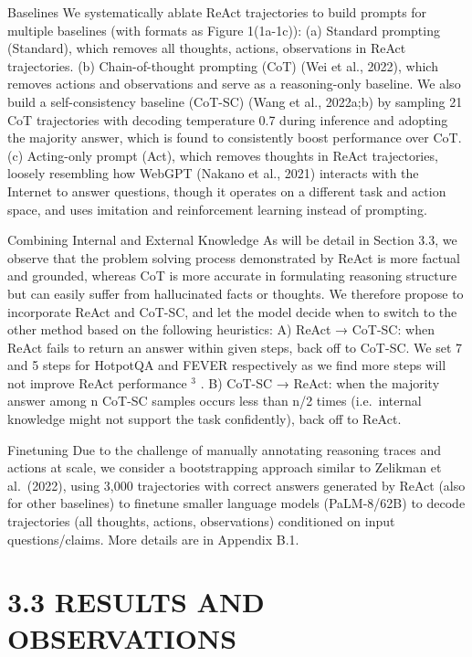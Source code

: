 \documentclass[
]{article}
\begin{document}
Baselines We systematically ablate ReAct trajectories to build prompts
for multiple baselines (with formats as Figure 1(1a-1c)): (a) Standard
prompting (Standard), which removes all thoughts, actions, observations
in ReAct trajectories. (b) Chain-of-thought prompting (CoT) (Wei et al.,
2022), which removes actions and observations and serve as a
reasoning-only baseline. We also build a self-consistency baseline
(CoT-SC) (Wang et al., 2022a;b) by sampling 21 CoT trajectories with
decoding temperature 0.7 during inference and adopting the majority
answer, which is found to consistently boost performance over CoT. (c)
Acting-only prompt (Act), which removes thoughts in ReAct trajectories,
loosely resembling how WebGPT (Nakano et al., 2021) interacts with the
Internet to answer questions, though it operates on a different task and
action space, and uses imitation and reinforcement learning instead of
prompting.

Combining Internal and External Knowledge As will be detail in Section
3.3, we observe that the problem solving process demonstrated by ReAct
is more factual and grounded, whereas CoT is more accurate in
formulating reasoning structure but can easily suffer from hallucinated
facts or thoughts. We therefore propose to incorporate ReAct and CoT-SC,
and let the model decide when to switch to the other method based on the
following heuristics: A) ReAct → CoT-SC: when ReAct fails to return an
answer within given steps, back off to CoT-SC. We set 7 and 5 steps for
HotpotQA and FEVER respectively as we find more steps will not improve
ReAct performance \(^{3}\) . B) CoT-SC → ReAct: when the majority answer
among n CoT-SC samples occurs less than n/2 times (i.e.~internal
knowledge might not support the task confidently), back off to ReAct.

Finetuning Due to the challenge of manually annotating reasoning traces
and actions at scale, we consider a bootstrapping approach similar to
Zelikman et al.~(2022), using 3,000 trajectories with correct answers
generated by ReAct (also for other baselines) to finetune smaller
language models (PaLM-8/62B) to decode trajectories (all thoughts,
actions, observations) conditioned on input questions/claims. More
details are in Appendix B.1.

\section{3.3 RESULTS AND OBSERVATIONS}\label{results-and-observations}
\end{document}
